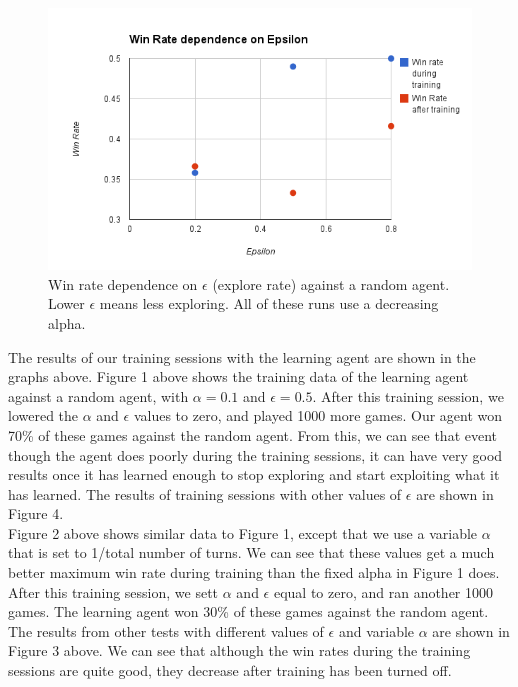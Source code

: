 \documentclass[letterpaper]{article}
\begin{document}
\begin{figure}
  \vspace{-2em}
  \begin{center}
    \includegraphics[width=\textwidth]{epsilonData.png}
    \vspace{-3em}
  \caption{Win rate dependence on $\epsilon$ (explore rate) against a random agent. Lower $\epsilon$ means less exploring. 
  All of these runs use a decreasing alpha.\label{epsilon}}
  \vspace{-1em}
  \end{center}
\end{figure}

The results of our training sessions with the learning agent are shown in the graphs above. Figure 1 above shows the training data of the learning agent against a random agent, with $\alpha=0.1$ and $\epsilon=0.5$. After this training session, we lowered the $\alpha$ and $\epsilon$ values to zero, and played 1000 more games. Our agent won 70\% of these games against the random agent. From this, we can see that event though the agent does poorly during the training sessions, it can have very good results once it has learned enough to stop exploring and start exploiting what it has learned. The results of training sessions with other values of $\epsilon$ are shown in Figure 4.\\

Figure 2 above shows similar data to Figure 1, except that we use a variable $\alpha$ that is set to 1/total number of turns. We can see that these values get a much better maximum win rate during training than the fixed alpha in Figure 1 does. After this training session, we sett $\alpha$ and $\epsilon$ equal to zero, and ran another 1000 games. The learning agent won 30\% of these games against the random agent. The results from other tests with different values of $\epsilon$ and variable $\alpha$ are shown in Figure 3 above. We can see that although the win rates during the training sessions are quite good, they decrease after training has been turned off. 
\end{document}
